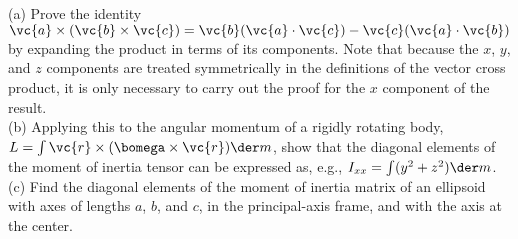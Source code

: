 (a) Prove the identity $\vc{a}\times(\vc{b}\times\vc{c})=\vc{b}(\vc{a}\cdot\vc{c})-\vc{c}(\vc{a}\cdot\vc{b})$
by expanding the product in terms of its components.
Note that because the $x$, $y$, and $z$ components are treated symmetrically in the definitions 
of the vector cross product, it is only necessary to carry out the proof for the $x$ component of
the result.\\
(b) Applying this to the angular momentum of a rigidly rotating body, $L=\int \vc{r}\times(\bomega\times\vc{r})\der m$,
show that the diagonal elements of the moment of inertia tensor can be expressed as, e.g.,
$I_{xx}=\int (y^2+z^2)\der m$.\\
(c) Find the diagonal elements of the moment of inertia matrix of an ellipsoid with
axes of lengths $a$, $b$, and $c$, in the principal-axis frame,
and with the axis at the center.\answercheck
